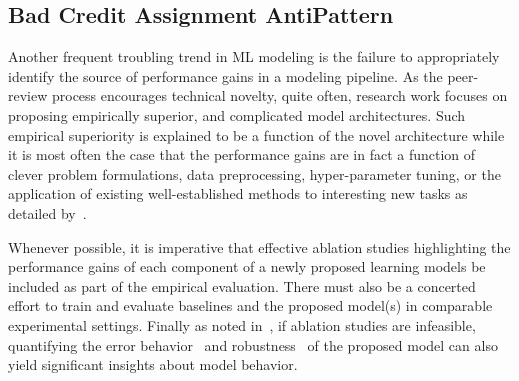 \subsection{Bad Credit Assignment AntiPattern}\label{sec:bad_credit_assignment}
Another frequent troubling trend in ML modeling is the failure to appropriately identify the source of performance gains in a modeling pipeline. As the peer-review process encourages technical novelty, quite often, research work focuses on proposing empirically superior, and complicated model architectures. Such empirical superiority is explained to be a function of the novel architecture while it is most often the case that the performance gains are in fact a function of clever problem formulations, data preprocessing, hyper-parameter tuning, or the application of existing well-established methods to interesting new tasks as detailed by~\cite{lipton2018troubling}. 

Whenever possible, it is imperative that effective ablation studies highlighting the performance gains of each component of a newly proposed learning models be included as part of the empirical evaluation. There must also be a concerted effort to train and evaluate baselines and the proposed model(s) in comparable experimental settings. Finally as noted in~\cite{lipton2018troubling}, if ablation studies are infeasible, quantifying the error behavior~\cite{kwiatkowski2013scaling} and robustness~\cite{cotterell2018all} of the proposed model can also yield significant insights about model behavior.